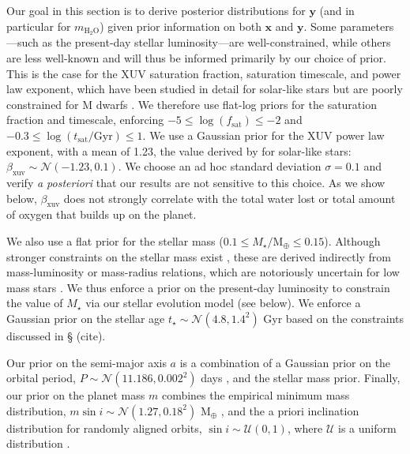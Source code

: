 \documentclass[preprint,12pt]{aastex}
\newcommand{\xxx}[1]{{\color{red} #1}} %
\newcommand{\cn}{\xxx{(cite)}} %
\begin{document}
Our goal in this section is to derive posterior distributions for $\mathbf{y}$ (and in particular for $m_\mathrm{H_2O}$) 
given prior information on both 
$\mathbf{x}$ and $\mathbf{y}$. Some parameters---such as the present-day stellar luminosity---are well-constrained,
while others are less well-known and will thus be informed primarily by our choice of prior. This is the case for
the XUV saturation fraction, saturation timescale, and power law exponent, which have been studied in detail 
for solar-like stars \citep{Ribas05} but are poorly constrained for M dwarfs \citep[see, e.g.,][]{LugerBarnes2015}. 
We therefore use flat-log priors for the saturation fraction and timescale, enforcing
$-5 \leq \log(f_\mathrm{sat}) \leq -2$ and $-0.3 \leq \log(t_\mathrm{sat} / \mathrm{Gyr}) \leq 1$. We use
a Gaussian prior for the XUV power law exponent, with a mean of 1.23, the value derived by \citep{Ribas05} for
solar-like stars: $\beta_\mathrm{xuv} \sim \mathcal{N}(-1.23, 0.1)$. We choose an ad hoc standard deviation
$\sigma = 0.1$ and verify \emph{a posteriori} that our results are not sensitive to this choice. As we show
below, $\beta_\mathrm{xuv}$ does not strongly correlate with the total water lost or total
amount of oxygen that builds up on the planet.

We also use a flat prior for the stellar mass ($0.1 \leq M_\star / \mathrm{M}_\oplus \leq 0.15$).
Although stronger constraints on the stellar mass exist \citep[e.g.,][]{Delfosse00,Segransan2003}, these are derived indirectly from mass-luminosity or mass-radius 
relations, which are notoriously uncertain for low mass stars \citep[e.g.,][]{Boyajian12}. We thus
enforce a prior on the present-day luminosity to constrain the value of $M_\star$ via our stellar evolution model (see below).
We enforce a Gaussian prior on the stellar age $t_\star \sim \mathcal{N}(4.8, 1.4^2)$ Gyr based on the constraints discussed
in \S\cn. 

Our prior on the semi-major axis $a$ is a combination of a Gaussian prior on the orbital period, 
$P \sim \mathcal{N}(11.186, 0.002^2)$ days \citep{AngladaEscude16}, and the stellar mass prior. 
Finally, our prior on the planet mass $m$ combines the empirical minimum mass distribution,
$m\sin i \sim \mathcal{N}(1.27, 0.18^2)$ M$_\oplus$ \citep{AngladaEscude16}, and the a priori inclination distribution
for randomly aligned orbits, 
$\sin i \sim \mathcal{U}(0, 1)$, where $\mathcal{U}$ is a uniform distribution \citep[e.g.,][]{Luger17}.
\end{document}

